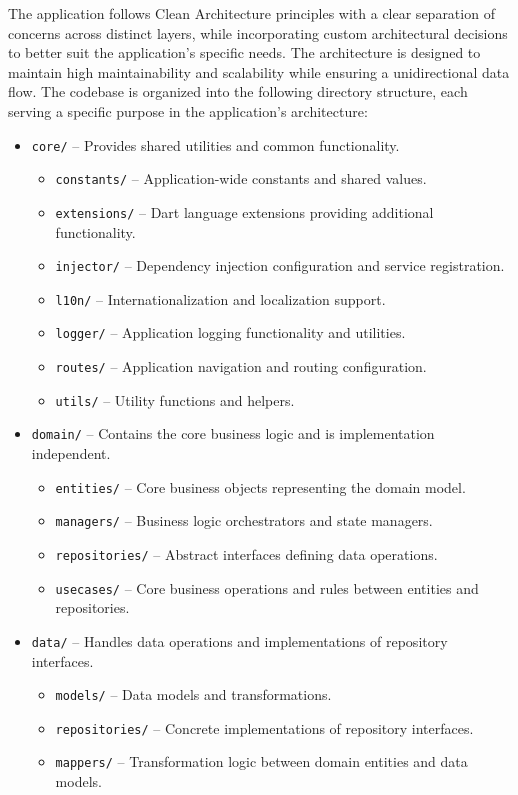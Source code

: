 The application follows Clean Architecture principles with a clear separation of concerns across distinct layers, while incorporating custom architectural decisions to better suit the application's specific needs. The architecture is designed to maintain high maintainability and scalability while ensuring a unidirectional data flow. The codebase is organized into the following directory structure, each serving a specific purpose in the application's architecture:

\begin{itemize}
    \item \texttt{core/} – Provides shared utilities and common functionality.
    \begin{itemize}
        \item \texttt{constants/} – Application-wide constants and shared values.
        \item \texttt{extensions/} – Dart language extensions providing additional functionality.
        \item \texttt{injector/} – Dependency injection configuration and service registration.
        \item \texttt{l10n/} – Internationalization and localization support.
        \item \texttt{logger/} – Application logging functionality and utilities.
        \item \texttt{routes/} – Application navigation and routing configuration.
        \item \texttt{utils/} – Utility functions and helpers.
    \end{itemize}

    \item \texttt{domain/} – Contains the core business logic and is implementation independent.
    \begin{itemize}
        \item \texttt{entities/} – Core business objects representing the domain model.
        \item \texttt{managers/} – Business logic orchestrators and state managers.
        \item \texttt{repositories/} – Abstract interfaces defining data operations.
        \item \texttt{usecases/} – Core business operations and rules between entities and repositories.
    \end{itemize}
    
    \item \texttt{data/} – Handles data operations and implementations of repository interfaces.
    \begin{itemize}
        \item \texttt{models/} – Data models and transformations.
        \item \texttt{repositories/} – Concrete implementations of repository interfaces.
        \item \texttt{mappers/} – Transformation logic between domain entities and data models.
    \end{itemize}
    

\end{itemize}
